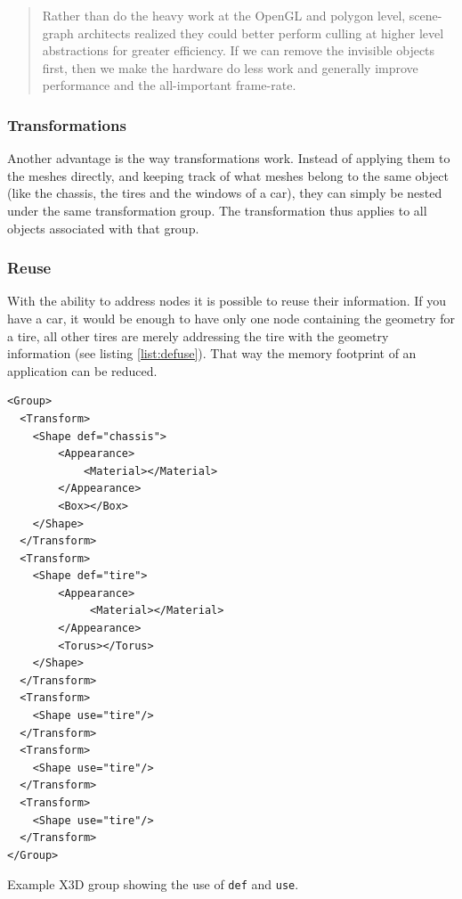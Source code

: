 \begin{quote}
  Rather than do the heavy work at the \gls{OpenGL} and polygon level,
  scene-graph architects realized they could better perform culling at
  higher level abstractions for greater efficiency. If we can remove the
  invisible objects first, then we make the hardware do less work and
  generally improve performance and the all-important frame-rate. \cite{realityprime}
\end{quote}

\subsubsection{Transformations}\label{transformations}

Another advantage is the way transformations work. Instead of applying
them to the meshes directly, and keeping track of what meshes belong to
the same object (like the chassis, the tires and the windows of a
car), they can simply be nested under the same transformation group. The
transformation thus applies to all objects associated with that group.

\subsubsection{Reuse}\label{reuse}

With the ability to address nodes it is possible to reuse their
information. If you have a car, it would be enough to have only one node
containing the geometry for a tire, all other tires are merely addressing
the tire with the geometry information (see listing \ref{list:defuse}).
That way the memory footprint of an application can be reduced.

\begin{listing}
  \begin{verbatim}
<Group>
  <Transform>
    <Shape def="chassis">
        <Appearance>
            <Material></Material>
        </Appearance>
        <Box></Box>
    </Shape>
  </Transform>
  <Transform>
    <Shape def="tire">
        <Appearance>
             <Material></Material>
        </Appearance>
        <Torus></Torus>
    </Shape>
  </Transform>
  <Transform>
    <Shape use="tire"/>
  </Transform>
  <Transform>
    <Shape use="tire"/>
  </Transform>
  <Transform>
    <Shape use="tire"/>
  </Transform>
</Group>
  \end{verbatim}
  \caption{Example \gls{X3D} group showing the use of \texttt{def} and \texttt{use}.}
  \label{list:defuse}
\end{listing}


